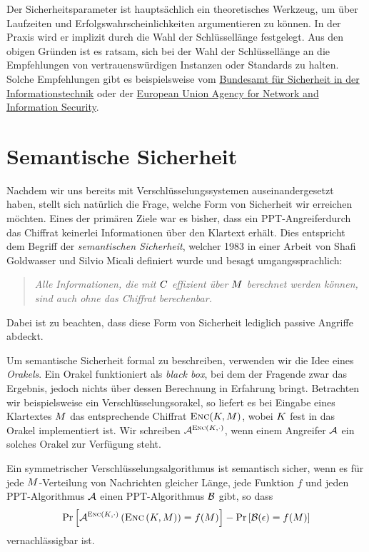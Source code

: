 Der Sicherheitsparameter ist hauptsächlich ein theoretisches Werkzeug,
um über Laufzeiten und Erfolgswahrscheinlichkeiten argumentieren zu
können. In der Praxis wird er implizit durch die Wahl der Schlüssellänge
festgelegt. Aus den obigen Gründen ist es ratsam, sich bei der Wahl der
Schlüssellänge an die Empfehlungen von vertrauenswürdigen Instanzen oder
Standards zu halten. Solche Empfehlungen gibt es beispielsweise vom
\href{https://www.bsi.bund.de/DE/Publikationen/TechnischeRichtlinien/tr02102/index_htm.html}{Bundesamt
  für Sicherheit in der Informationstechnik} oder der
\href{https://www.enisa.europa.eu/activities/identity-and-trust/library/deliverables/algorithms-key-size-and-parameters-report-2014}{European
  Union Agency for Network and Information Security}.

\section{Semantische  Sicherheit}
\label{ch:sicherheitsbegriffe:semantischesicherheit} Nachdem
wir uns bereits mit Verschlüsselungssystemen auseinandergesetzt haben,
stellt sich natürlich die Frage, welche Form von Sicherheit wir
erreichen möchten.  Eines der primären Ziele war es bisher, dass ein
PPT-Angreifer\indexPPTAdv durch das Chiffrat keinerlei Informationen
über den Klartext erhält. Dies entspricht dem Begriff der
\emph{semantischen Sicherheit}, welcher 1983 in einer Arbeit von Shafi
Goldwasser und Silvio Micali \cite{Goldwasser1984} definiert wurde und
besagt umgangssprachlich:
\begin{quote} \emph{Alle Informationen, die mit $C$ effizient
    über $M$ berechnet werden können, sind auch ohne das Chiffrat
    berechenbar.}
\end{quote} Dabei ist zu beachten, dass diese Form von Sicherheit
lediglich passive Angriffe abdeckt.

Um semantische Sicherheit formal zu beschreiben, verwenden wir die Idee
eines \emph{Orakels}\indexOracle. Ein Orakel funktioniert als
\emph{black box}, bei dem der Fragende zwar das Ergebnis, jedoch nichts
über dessen Berechnung in Erfahrung bringt. Betrachten wir
beispielsweise ein Verschlüsselungsorakel, so liefert es bei Eingabe
eines Klartextes $M$ das entsprechende Chiffrat $\textsc{Enc}(K,
M)$, wobei $K$ fest in das Orakel implementiert ist. Wir
schreiben $\mathcal{A}^{\textsc{Enc} (K, \cdot)}$, wenn einem Angreifer $\mathcal{A}$ ein
solches Orakel zur Verfügung steht.

\begin{definition}\label{def:semsec} Ein
  symmetrischer Verschlüsselungsalgorithmus ist semantisch sicher, wenn es
  für jede $M$-Verteilung von Nachrichten gleicher Länge, jede
  Funktion $f$ und jeden PPT-Algorithmus $\mathcal{A}$ einen PPT-Algorithmus $\mathcal{B}$
  gibt, so dass
  \begin{align*} \text{Pr}\left[ \mathcal{A}^{\textsc{Enc} (K,\cdot)} \left( \textsc{Enc} \left(
    K, M \right) \right) = f(M) \right] - \text{Pr} \left[ \mathcal{B}
    (\epsilon) = f (M) \right]
  \end{align*} vernachlässigbar ist.
\end{definition}


